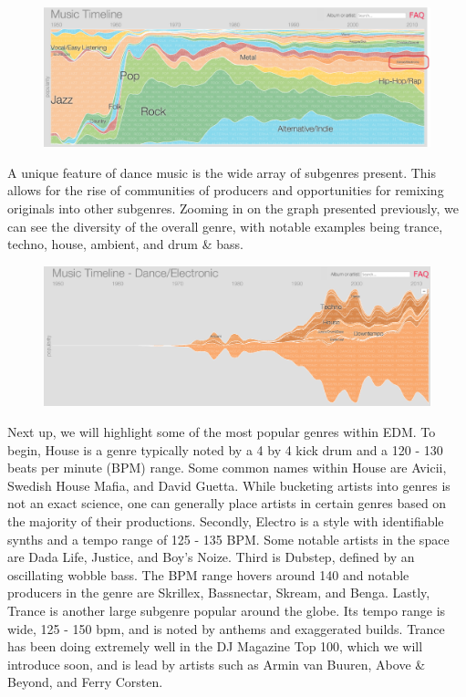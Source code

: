 \documentclass[12pt]{dalcsthesis}
\begin{document}
\begin{figure}[h]
\includegraphics[scale=.49]{genre_graph}
\centering
\end{figure}

A unique feature of dance music is the wide array of subgenres present. This allows for the rise of communities of producers and opportunities for remixing originals into other subgenres. Zooming in on the graph presented previously, we can see the diversity of the overall genre, with notable examples being trance, techno, house, ambient, and drum \& bass. \newpage

\begin{figure}[h]
\includegraphics[scale=.65]{subgenre_graph}
\centering
\end{figure}

Next up, we will highlight some of the most popular genres within EDM. To begin, House is a genre typically noted by a 4 by 4 kick drum and a 120 - 130 beats per minute (BPM) range. Some common names within House are Avicii, Swedish House Mafia, and David Guetta. While bucketing artists into genres is not an exact science, one can generally place artists in certain genres based on the majority of their productions. Secondly, Electro is a style with identifiable synths and a tempo range of 125 - 135 BPM. Some notable artists in the space are Dada Life, Justice, and Boy's Noize. Third is Dubstep, defined by an oscillating wobble bass. The BPM range hovers around 140 and notable producers in the genre are Skrillex, Bassnectar, Skream, and Benga. Lastly, Trance is another large subgenre popular around the globe. Its tempo range is wide, 125 - 150 bpm, and is noted by anthems and exaggerated builds. Trance has been doing extremely well in the DJ Magazine Top 100, which we will introduce soon, and is lead by artists such as Armin van Buuren, Above \& Beyond, and Ferry Corsten.
\end{document}
